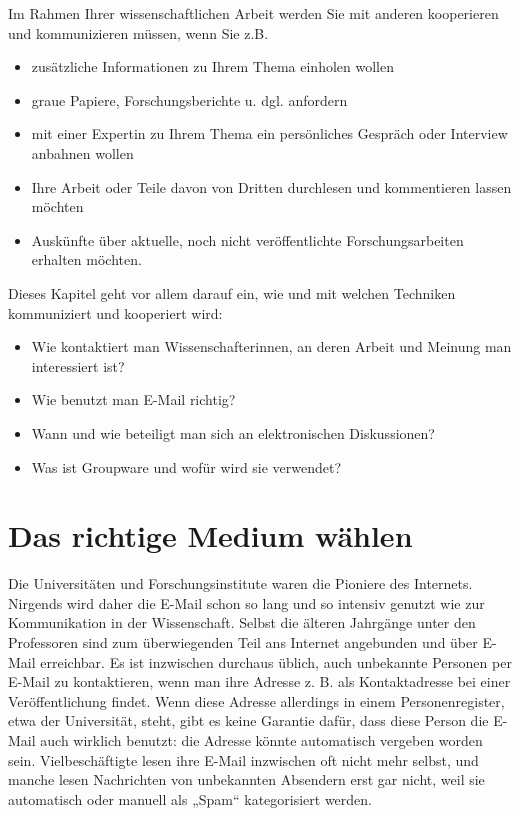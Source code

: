 \documentclass[]{book}
\providecommand{\tightlist}{%
  \setlength{\itemsep}{0pt}\setlength{\parskip}{0pt}}
\theoremstyle{definition}
\theoremstyle{definition}
\theoremstyle{definition}
\theoremstyle{remark}
\begin{document}
Im Rahmen Ihrer wissenschaftlichen Arbeit werden Sie mit anderen
kooperieren und kommunizieren müssen, wenn Sie z.B.

\begin{itemize}
\tightlist
\item
  zusätzliche Informationen zu Ihrem Thema einholen wollen
\item
  graue Papiere, Forschungsberichte u. dgl. anfordern
\item
  mit einer Expertin zu Ihrem Thema ein persönliches Gespräch oder
  Interview anbahnen wollen
\item
  Ihre Arbeit oder Teile davon von Dritten durchlesen und kommentieren
  lassen möchten
\item
  Auskünfte über aktuelle, noch nicht veröffentlichte Forschungsarbeiten
  erhalten möchten.
\end{itemize}

Dieses Kapitel geht vor allem darauf ein, wie und mit welchen Techniken
kommuniziert und kooperiert wird:

\begin{itemize}
\tightlist
\item
  Wie kontaktiert man Wissenschafterinnen, an deren Arbeit und Meinung
  man interessiert ist?
\item
  Wie benutzt man E-Mail richtig?
\item
  Wann und wie beteiligt man sich an elektronischen Diskussionen?
\item
  Was ist Groupware und wofür wird sie verwendet?
\end{itemize}

\section{Das richtige Medium wählen}\label{das-richtige-medium-wahlen}

Die Universitäten und Forschungsinstitute waren die Pioniere des
Internets. Nirgends wird daher die E-Mail schon so lang und so intensiv
genutzt wie zur Kommunikation in der Wissenschaft. Selbst die älteren
Jahrgänge unter den Professoren sind zum überwiegenden Teil ans Internet
angebunden und über E-Mail erreichbar. Es ist inzwischen durchaus
üblich, auch unbekannte Personen per E-Mail zu kontaktieren, wenn man
ihre Adresse z. B. als Kontaktadresse bei einer Veröffentlichung findet.
Wenn diese Adresse allerdings in einem Personenregister, etwa der
Universität, steht, gibt es keine Garantie dafür, dass diese Person die
E-Mail auch wirklich benutzt: die Adresse könnte automatisch vergeben
worden sein. Vielbeschäftigte lesen ihre E-Mail inzwischen oft nicht
mehr selbst, und manche lesen Nachrichten von unbekannten Absendern erst
gar nicht, weil sie automatisch oder manuell als „Spam`` kategorisiert
werden.
\end{document}
